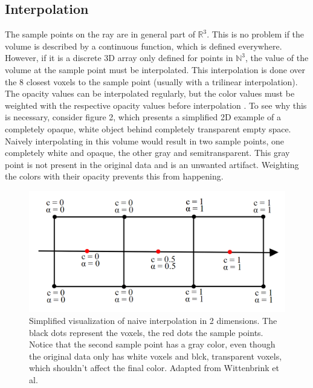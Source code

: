 \subsection{Interpolation}
The sample points on the ray are in general part of $\mathbb{R}^3$. This is no problem if the volume is described by a continuous function, which is defined everywhere. However, if it is a discrete 3D array only defined for points in $\mathbb{N}^3$, the value of the volume at the sample point must be interpolated.
 This interpolation is done over the 8 closest voxels to the sample point (usually with a trilinear interpolation). The opacity values can be interpolated regularly, but the color values must be weighted with the respective opacity values before interpolation \cite{729595}. To see why this is necessary, consider figure 2, which presents a simplified 2D example of a completely  opaque, white object behind completely transparent empty space. Naively interpolating in this volume would result in two sample points, one completely white and opaque, the other gray and semitransparent. This gray point is not present in the original data and is an unwanted artifact. Weighting the colors with their opacity prevents this from happening.
 \begin{figure}[htb]
  \centering
  \includegraphics[width=.8\linewidth]{weighted_interpolation.png}
  \parbox[t]{.9\columnwidth}{\relax}
  \caption{\label{fig:firstExample}
          Simplified visualization of naive interpolation in 2 dimensions. The black dots represent the voxels, the red dots the sample points. Notice that the second sample point has a gray color, even though the original data only has white voxels and blck, transparent voxels, which shouldn't affect the final color. Adapted from Wittenbrink et al.\cite{729595}}
\end{figure}

